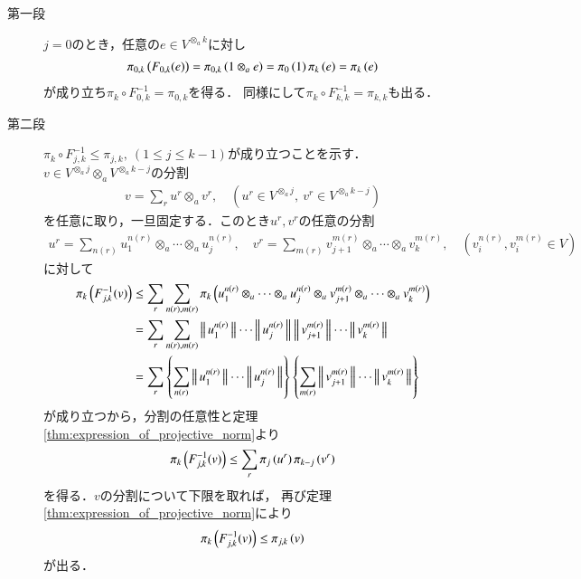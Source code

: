 	\begin{prf}\mbox{}
		\begin{description}
			\item[第一段]
				$j=0$のとき，任意の$e \in V^{\otimes_a k}$に対し
				\begin{align}
					\projectivenorm{F_{0,k}(e)}{0,k}
					= \projectivenorm{1 \otimes_a e}{0,k}
					= \projectivenorm{1}{0}\projectivenorm{e}{k}
					= \projectivenorm{e}{k}
				\end{align}
				が成り立ち$\pi_k \circ F^{-1}_{0,k} = \pi_{0,k}$を得る．
				同様にして$\pi_k \circ F^{-1}_{k,k} = \pi_{k,k}$も出る．
				
			\item[第二段]
				$\pi_k \circ F^{-1}_{j,k} \leq \pi_{j,k},\ (1 \leq j \leq k-1)$が成り立つことを示す．
				$v \in V^{\otimes_a j} \otimes_a V^{\otimes_a k-j}$の分割
				\begin{align}
					v = \sum_{r} u^r \otimes_a v^r,
					\quad (u^r \in V^{\otimes_a j},\ v^r \in V^{\otimes_a k-j})
				\end{align}
				を任意に取り，一旦固定する．このとき$u^r,v^r$の任意の分割
				\begin{align}
					u^r = \sum_{n(r)} u^{n(r)}_1 \otimes_a \cdots \otimes_a u^{n(r)}_j, 
					\quad v^r = \sum_{m(r)} v^{m(r)}_{j+1} \otimes_a \cdots \otimes_a v^{m(r)}_{k},
					\quad (v^{n(r)}_i,v^{m(r)}_i \in V)
				\end{align}
				に対して
				\begin{align}
					\projectivenorm{F^{-1}_{j,k}(v)}{k}
					&\leq \sum_{r} \sum_{n(r),m(r)} \projectivenorm{u^{n(r)}_1 \otimes_a \cdots \otimes_a u^{n(r)}_j \otimes_a v^{m(r)}_{j+1} \otimes_a \cdots \otimes_a v^{m(r)}_{k}}{k} \\
					&= \sum_{r} \sum_{n(r),m(r)} \Norm{u^{n(r)}_1}{} \cdots \Norm{u^{n(r)}_j}{} \Norm{v^{m(r)}_{j+1}}{} \cdots \Norm{v^{m(r)}_k}{} \\
					&= \sum_{r} \left\{ \sum_{n(r)} \Norm{u^{n(r)}_1}{} \cdots \Norm{u^{n(r)}_j}{} \right\} \left\{ \sum_{m(r)} \Norm{v^{m(r)}_{j+1}}{} \cdots \Norm{v^{m(r)}_k}{} \right\} 
				\end{align}
				が成り立つから，分割の任意性と定理\ref{thm:expression_of_projective_norm}より
				\begin{align}
					\projectivenorm{F^{-1}_{j,k}(v)}{k} 
					\leq \sum_r \projectivenorm{u^r}{j}\projectivenorm{v^r}{k-j}
				\end{align}
				を得る．$v$の分割について下限を取れば，
				再び定理\ref{thm:expression_of_projective_norm}により
				\begin{align}
					\projectivenorm{F^{-1}_{j,k}(v)}{k} \leq \projectivenorm{v}{j,k}
				\end{align}
				が出る．
			

\end{description}
\end{prf}
